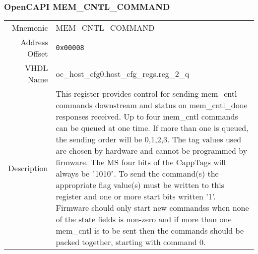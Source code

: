\subsubsection{OpenCAPI MEM\_CNTL\_COMMAND}
\begin{tabular}{ r | p{350px} }
  Mnemonic       & MEM\_CNTL\_COMMAND             \\
  Address Offset & \texttt{0x00008}                         \\
  VHDL Name      & oc\_host\_cfg0.host\_cfg\_regs.reg\_2\_q \\ \hline

  Description &
  This register provides control for sending mem\_cntl commands downstream and status on
  mem\_cntl\_done responses received. Up to four mem\_cntl commands can be queued at one time.
  If more than one is queued, the sending order will be 0,1,2,3. The tag values used are
  chosen by hardware and cannot be programmed by firmware. The MS four bits of the CappTags
  will always be "1010".
  To send the command(s) the appropriate flag value(s) must be written to this register
  and one or more start bits written '1'.
  Firmware should only start new commandss when none of the state fields is non-zero
  and if more than one mem\_cntl is to be sent then the commands should be packed
  together, starting with command 0. \\
\end{tabular}
\\
